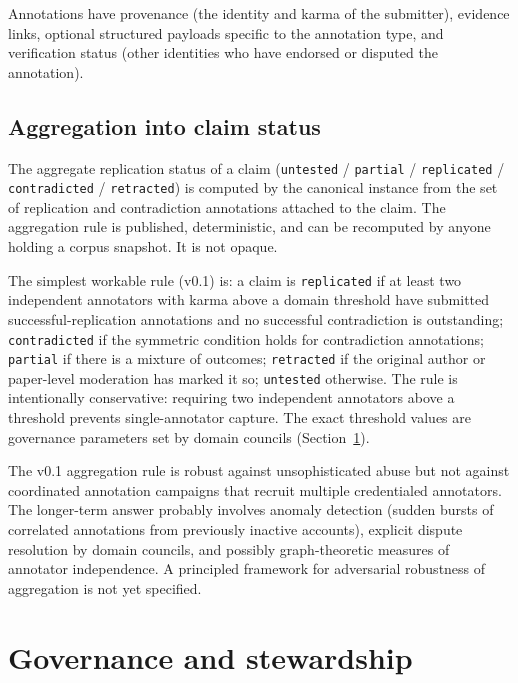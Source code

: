 \documentclass[11pt]{rrvix}
\begin{document}
Annotations have provenance (the identity and karma of the submitter), evidence links, optional structured payloads specific to the annotation type, and verification status (other identities who have endorsed or disputed the annotation).

\subsection{Aggregation into claim status}

The aggregate replication status of a claim (\texttt{untested} / \texttt{partial} / \texttt{replicated} / \texttt{contradicted} / \texttt{retracted}) is computed by the canonical instance from the set of replication and contradiction annotations attached to the claim. The aggregation rule is published, deterministic, and can be recomputed by anyone holding a corpus snapshot. It is not opaque.

The simplest workable rule (v0.1) is: a claim is \texttt{replicated} if at least two independent annotators with karma above a domain threshold have submitted successful-replication annotations and no successful contradiction is outstanding; \texttt{contradicted} if the symmetric condition holds for contradiction annotations; \texttt{partial} if there is a mixture of outcomes; \texttt{retracted} if the original author or paper-level moderation has marked it so; \texttt{untested} otherwise. The rule is intentionally conservative: requiring two independent annotators above a threshold prevents single-annotator capture. The exact threshold values are governance parameters set by domain councils (Section~\ref{sec:governance}).

\begin{openquestion}
\label{oq:aggregation-adversarial}
The v0.1 aggregation rule is robust against unsophisticated abuse but not against coordinated annotation campaigns that recruit multiple credentialed annotators. The longer-term answer probably involves anomaly detection (sudden bursts of correlated annotations from previously inactive accounts), explicit dispute resolution by domain councils, and possibly graph-theoretic measures of annotator independence. A principled framework for adversarial robustness of aggregation is not yet specified.
\end{openquestion}

\section{Governance and stewardship}
\label{sec:governance}
\end{document}
